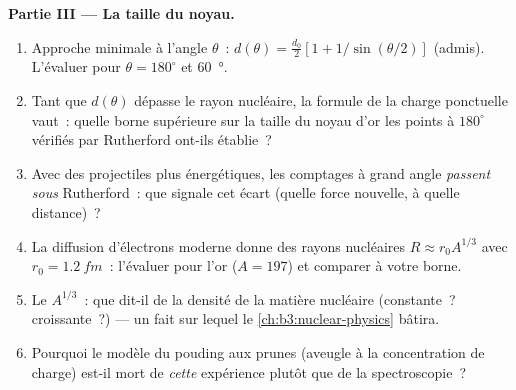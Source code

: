 \begin{problem}
\medskip\noindent\textbf{Partie III --- La taille du noyau.}
\begin{enumerate}[resume]
  \item Approche minimale à l'angle $\theta$~: $d(\theta) =
        \tfrac{d_0}2[1 + 1/\sin(\theta/2)]$ (admis). L'évaluer pour
        $\theta = 180^\circ$ et \qty{60}{\degree}.
  \item Tant que $d(\theta)$ dépasse le rayon nucléaire, la formule de
        la charge ponctuelle vaut~: quelle borne supérieure sur la
        taille du noyau d'or les points à $180^\circ$ vérifiés par
        Rutherford ont-ils établie~?
  \item Avec des projectiles plus énergétiques, les comptages à grand
        angle \emph{passent sous} Rutherford~: que signale cet écart
        (quelle force nouvelle, à quelle distance)~?
  \item La diffusion d'électrons moderne donne des rayons nucléaires $R
        \approx r_0A^{1/3}$ avec $r_0 = \qty{1.2}{fm}$~: l'évaluer
        pour l'or ($A = 197$) et comparer à votre borne.
  \item Le $A^{1/3}$~: que dit-il de la densité de la matière
        nucléaire (constante~? croissante~?) --- un fait sur lequel le
        \cref{ch:b3:nuclear-physics} bâtira.
  \item Pourquoi le modèle du pouding aux prunes (aveugle à la
        concentration de charge) est-il mort de \emph{cette}
        expérience plutôt que de la spectroscopie~?
\end{enumerate}


\end{problem}
